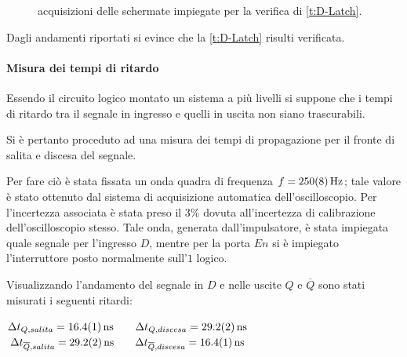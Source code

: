 \begin{figure}[htb]
{			\label{f:sci}
		}
		\qquad
		\caption{acquisizioni delle schermate impiegate per la verifica di \tablename{ \ref{t:D-Latch}}.}
		\label{o:D-Latch}
	\end{figure}
	Dagli andamenti riportati si evince che la \tablename{ \ref{t:D-Latch}}
	risulti verificata.
\paragraph{Misura dei tempi di ritardo}
	Essendo il circuito logico montato un sistema a più livelli
	si suppone che i tempi di ritardo tra il segnale in ingresso e quelli in uscita non siano trascurabili.

	Si è pertanto proceduto ad una misura dei tempi di propagazione per il fronte di salita e discesa del segnale.

	Per fare ciò è stata fissata un onda quadra di frequenza $f=\SI{250\pm 8}{\hertz}$; tale valore è stato ottenuto dal sistema di acquisizione automatica dell'oscilloscopio. Per l'incertezza associata  è stata preso il 3\% dovuta all'incertezza di calibrazione dell'oscilloscopio stesso.
	Tale onda, generata dall'impulsatore, è stata impiegata quale  segnale per l'ingresso $D$, mentre per la porta $En$ si è impiegato l'interruttore  posto normalmente sull'$1$ logico.

	Visualizzando l'andamento del segnale in $D$ e nelle uscite $Q$ e $\overline{Q}$
	sono stati misurati i seguenti ritardi:\\
	\begin{center}
		$\Delta t_{Q,salita}=\SI{16.4 \pm 0.1}{\ns} \qquad  \Delta t_{Q,discesa}=\SI{29.2 \pm 0.2}{\ns} $\\
		$\Delta t_{\overline{Q},salita}=\SI{29.2 \pm 0.2}{\ns} \qquad  \Delta t_{\overline{Q},discesa}=\SI{16.4 \pm 0.1}{\ns}$\\
	\end{center}

